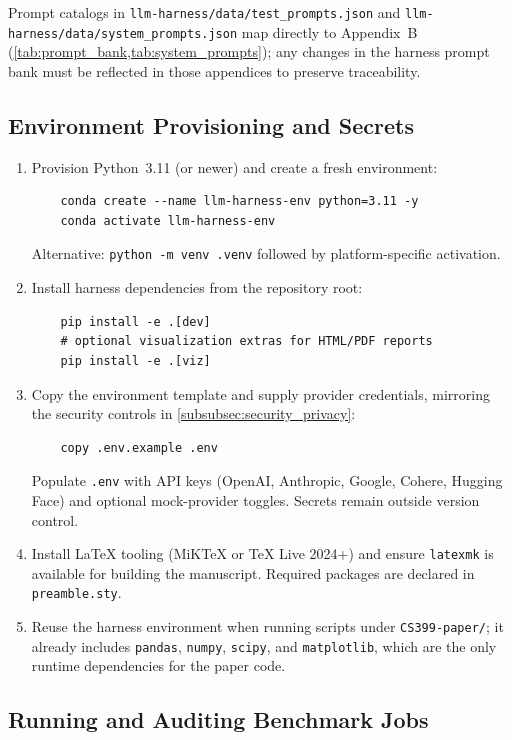 Prompt catalogs in \texttt{llm-harness/data/test\_prompts.json} and \texttt{llm-harness/data/system\_prompts.json} map directly to Appendix~B (\cref{tab:prompt_bank,tab:system_prompts}); any changes in the harness prompt bank must be reflected in those appendices to preserve traceability.

\subsection{Environment Provisioning and Secrets}
\label{subsec:env_setup}

\begin{enumerate}
	\item Provision Python~3.11 (or newer) and create a fresh environment:
	\begin{verbatim}
	conda create --name llm-harness-env python=3.11 -y
	conda activate llm-harness-env
	\end{verbatim}
	Alternative: \texttt{python -m venv .venv} followed by platform-specific activation.
	\item Install harness dependencies from the repository root:
	\begin{verbatim}
	pip install -e .[dev]
	# optional visualization extras for HTML/PDF reports
	pip install -e .[viz]
	\end{verbatim}
	\item Copy the environment template and supply provider credentials, mirroring the security controls in \cref{subsubsec:security_privacy}:
	\begin{verbatim}
	copy .env.example .env
	\end{verbatim}
	Populate \texttt{.env} with API keys (OpenAI, Anthropic, Google, Cohere, Hugging Face) and optional mock-provider toggles. Secrets remain outside version control.
		\item Install LaTeX tooling (MiKTeX or TeX Live 2024+) and ensure \texttt{latexmk} is available for building the manuscript. Required packages are declared in \texttt{preamble.sty}.
		\item Reuse the harness environment when running scripts under \texttt{CS399-paper/}; it already includes \texttt{pandas}, \texttt{numpy}, \texttt{scipy}, and \texttt{matplotlib}, which are the only runtime dependencies for the paper code.
\end{enumerate}

\subsection{Running and Auditing Benchmark Jobs}
\label{subsec:harness_execution}

